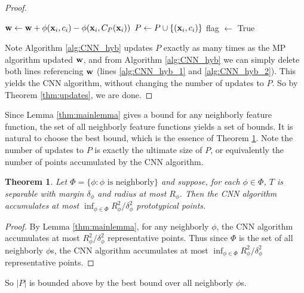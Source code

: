 \documentclass{article}
\newtheorem{theorem}{Theorem}
\begin{document}
\begin{proof}
\begin{algorithm}[h!]
\begin{algorithmic}[1]
		\STATE ${\bf w} \leftarrow {\bf w} + \phi({\bf x}_i,c_i)-\phi({\bf x}_i,C_P({\bf x}_i))$ \label{alg:CNN_hyb_2}
		\STATE $P \leftarrow P \cup \{({\bf x}_i , c_i)\}$
		\STATE flag $\leftarrow$ True
	\ENDIF
\ENDFOR
\ENDWHILE
\end{algorithmic}
\end{algorithm}
Note Algorithm \ref{alg:CNN_hyb} updates $P$ exactly as many times as the MP algorithm updated ${\bf w}$, and from Algorithm \ref{alg:CNN_hyb} we can simply delete both lines referencing ${\bf w}$ (lines \ref{alg:CNN_hyb_1} and \ref{alg:CNN_hyb_2}). This yields the CNN algorithm, without changing the number of updates to $P$. So by Theorem \ref{thm:updates}, we are done.
\end{proof}

Since Lemma \ref{thm:mainlemma} gives a bound for any neighborly feature function, the set of all neighborly feature functions yields a set of bounds. It is natural to choose the best bound, which is the essence of Theorem \ref{thm:maintheorem}. Note the number of updates to $P$ is exactly the ultimate size of $P$, or equivalently the number of points accumulated by the CNN algorithm.

\begin{theorem}
\label{thm:maintheorem}
Let $\Phi = \{ \phi : \phi \text{ is neighborly} \}$ and suppose, for each $\phi \in \Phi$, $T$ is separable with margin $\delta_\phi$ and radius at most $R_\phi$. Then the CNN algorithm accumulates at most $\inf_{\phi \in \Phi} R_\phi^2 / \delta_\phi^2$ prototypical points.
\end{theorem}
\begin{proof}
By Lemma \ref{thm:mainlemma}, for any neighborly $\phi$, the CNN algorithm accumulates at most $R_\phi^2/\delta_\phi^2$ representative points. Thus since $\Phi$ is the set of all neighborly $\phi$s, the CNN algorithm accumulates at most $\inf_{\phi \in \Phi} R_\phi^2/\delta_\phi^2$ representative points.
\end{proof}

So $|P|$ is bounded above by the best bound over all neighborly $\phi$s. 
\end{document}
